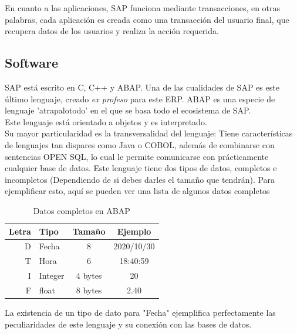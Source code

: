 \documentclass[openany,overnay,a4paper, twoside, 12pt]{book}
\begin{document}
En cuanto a las aplicaciones, SAP funciona mediante transacciones, en otras palabras, cada aplicación es creada como una transacción del usuario final, que recupera datos de los usuarios y realiza la acción requerida.
\newpage
\subsection{Software}
SAP está escrito en C, C++ y ABAP. Una de las cualidades de SAP es este último lenguaje, creado \textit{ex profeso} para este ERP. ABAP es una especie de lenguaje 'atrapalotodo' en el que se basa todo el ecosistema de SAP. \\Este lenguaje está orientado a objetos y es interpretado. \\ Su mayor particularidad es la transversalidad del lenguaje: Tiene características de lenguajes tan dispares como Java o COBOL, además de combinarse con sentencias OPEN SQL, lo cual le permite comunicarse con prácticamente cualquier base de datos. Este lenguaje tiene dos tipos de datos, completos e incompletos (Dependiendo de si debes darles el tamaño que tendrán). Para ejemplificar esto, aquí se pueden ver una lista de algunos datos completos
\begin{table}[h]
\begin{center}
\begin{tabular}{| r | l | c | c|}
\hline
Letra & Tipo & Tamaño & Ejemplo \\ \hline
D & Fecha & 8 & 2020/10/30 \\
T & Hora & 6 & 18:40:59 \\\hline
I & Integer & 4 bytes & 20 \\ 
F & float & 8 bytes & 2.40 \\\hline
\end{tabular}
\caption{Datos completos en ABAP}
La existencia de un tipo de dato para "Fecha" ejemplifica perfectamente las peculiaridades de este lenguaje y su conexión con las bases de datos. 

\end{center}
\end{table}
\end{document}
